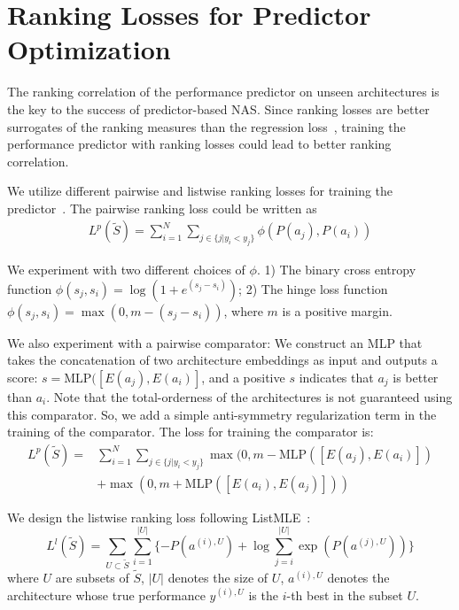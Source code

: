 \documentclass[runningheads]{llncs}
\begin{document}
\section{Ranking Losses for Predictor Optimization}

The ranking correlation of the performance predictor on unseen architectures is the key to the success of predictor-based NAS. 
Since ranking losses are better surrogates of the ranking measures than the regression loss~\cite{chen2009}, training the performance predictor with ranking losses could lead to better ranking correlation.

We utilize different pairwise and listwise ranking losses for training the predictor~\cite{burges2005learning,shashua2003ranking,xia2008listwise}. The pairwise ranking loss could be written as
\begin{equation}
    \begin{aligned}
    L^p(\tilde{S})= \sum_{i=1}^{N} \sum_{j \in \{j | y_i < y_j\}} \phi(P(a_j), P(a_i))
    \end{aligned}
\end{equation}


We experiment with two different choices of $\phi$. 1) The binary cross entropy function $\phi(s_j, s_i)=\log(1 + e^{(s_j - s_i)})$; 
2) The hinge loss function $\phi(s_j, s_i)= \max(0, m - (s_j - s_i))$, where $m$ is a positive margin.

We also experiment with a pairwise comparator: We construct an MLP that takes the concatenation of two architecture embeddings as input and outputs a score: $s=\mbox{MLP}([E(a_j), E(a_i)]$, and a positive $s$ indicates that $a_j$ is better than $a_i$.  Note that the total-orderness of the architectures is not guaranteed using this comparator. So, we add a simple anti-symmetry regularization term in the training of the comparator. The loss for training the comparator is:
\begin{equation}
    \begin{aligned}
    L^p(\tilde{S})= &\sum_{i=1}^{N} \sum_{j \in \{j | y_i < y_j\}} \max(0, m - \mbox{MLP}([E(a_j), E(a_i)]) \\
    &+ \max(0, m + \mbox{MLP}([E(a_i), E(a_j)]))
    \end{aligned}
\end{equation}


We design the listwise ranking loss following ListMLE~\cite{xia2008listwise}:
\begin{equation}
    L^l(\tilde{S}) = \sum_{U \subset \tilde{S}} \sum_{i=1}^{|U|} \{-P(a^{(i), U}) + \log\sum_{j=i}^{|U|} \exp(P(a^{(j), U}))\}
\end{equation}
where $U$ are subsets of $\tilde{S}$, $|U|$ denotes the size of $U$, $a^{(i), U}$ denotes the architecture whose true performance $y^{(i), U}$ is the $i$-th best in the subset $U$.
\end{document}
